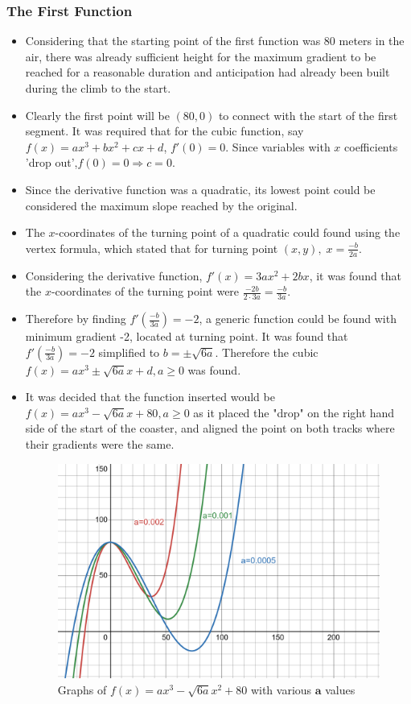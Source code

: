 \documentclass[11pt, letterpaper]{article}
\begin{document}
\subsubsection{The First Function}
\begin{itemize}
	\item Considering that the starting point of the first function was 80 meters in the air, there was already sufficient height for the maximum gradient to be reached for a reasonable duration and  anticipation had already been built during the climb to the start.
	\item Clearly the first point will be $(80, 0)$ to connect with the start of the first segment. It was required that for the cubic function, say $f(x)=ax^3 +bx^2 +cx +d$, $f'(0)=0$. Since variables with $x$ coefficients 'drop out',$f(0)=0\Rightarrow c=0$.
	\item Since the derivative function was a quadratic, its lowest point could be considered the maximum slope reached by the original.
	\item The $x$-coordinates of the turning point of a quadratic could found using the vertex formula, which stated that for turning point $(x, y),\; x=\frac{-b}{2a}$.
	\item Considering the derivative function, $f'(x)=3ax^2+2bx$, it was found that the $x$-coordinates of the turning point were $\frac{-2b}{2\cdot3a}=\frac{-b}{3a}$.
	\item Therefore by finding $f'(\frac{-b}{3a})=-2$, a generic function could be found with minimum gradient -2, located at turning point. It was found that $f'(\frac{-b}{3a})=-2$ simplified to $b=\pm\sqrt{6a}$. Therefore the cubic $f(x)=ax^3\pm\sqrt{6a}x+d, a\geq0$ was found. 
	\item It was decided that the function inserted would be $f(x)=ax^3-\sqrt{6a}x+80, a\geq0$ as it placed the "drop" on the right hand side of the start of the coaster, and aligned the point on both tracks where their gradients were the same.
		\begin{figure}[h]
		\centering
		\includegraphics[width=15cm]{Eaxmple Cubic.png}
		\caption{Graphs of $f(x)=ax^{3}-\sqrt{6a}x^{2}+80$ with various $\mathbf{a}$ values}
	\end{figure}


\end{itemize}
\end{document}
